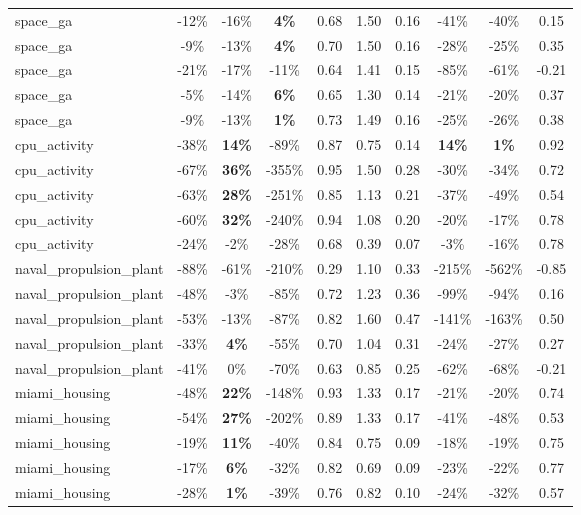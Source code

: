 \begin{table}[!htbp]
\begin{small}
\begin{sc}
{\begin{tabular}{lccccccccc}
space\_ga & -12\% & -16\% & \textbf{4\%} & 0.68 & 1.50 & 0.16 & -41\% & -40\% & 0.15 \\
space\_ga & -9\% & -13\% & \textbf{4\%} & 0.70 & 1.50 & 0.16 & -28\% & -25\% & 0.35 \\
space\_ga & -21\% & -17\% & -11\% & 0.64 & 1.41 & 0.15 & -85\% & -61\% & -0.21 \\
space\_ga & -5\% & -14\% & \textbf{6\%} & 0.65 & 1.30 & 0.14 & -21\% & -20\% & 0.37 \\
space\_ga & -9\% & -13\% & \textbf{1\%} & 0.73 & 1.49 & 0.16 & -25\% & -26\% & 0.38 \\
cpu\_activity & -38\% & \textbf{14\%} & -89\% & 0.87 & 0.75 & 0.14 & \textbf{14\%} & \textbf{1\%} & 0.92 \\
cpu\_activity & -67\% & \textbf{36\%} & -355\% & 0.95 & 1.50 & 0.28 & -30\% & -34\% & 0.72 \\
cpu\_activity & -63\% & \textbf{28\%} & -251\% & 0.85 & 1.13 & 0.21 & -37\% & -49\% & 0.54 \\
cpu\_activity & -60\% & \textbf{32\%} & -240\% & 0.94 & 1.08 & 0.20 & -20\% & -17\% & 0.78 \\
cpu\_activity & -24\% & -2\% & -28\% & 0.68 & 0.39 & 0.07 & -3\% & -16\% & 0.78 \\
naval\_propulsion\_plant & -88\% & -61\% & -210\% & 0.29 & 1.10 & 0.33 & -215\% & -562\% & -0.85 \\
naval\_propulsion\_plant & -48\% & -3\% & -85\% & 0.72 & 1.23 & 0.36 & -99\% & -94\% & 0.16 \\
naval\_propulsion\_plant & -53\% & -13\% & -87\% & 0.82 & 1.60 & 0.47 & -141\% & -163\% & 0.50 \\
naval\_propulsion\_plant & -33\% & \textbf{4\%} & -55\% & 0.70 & 1.04 & 0.31 & -24\% & -27\% & 0.27 \\
naval\_propulsion\_plant & -41\% & 0\% & -70\% & 0.63 & 0.85 & 0.25 & -62\% & -68\% & -0.21 \\
miami\_housing & -48\% & \textbf{22\%} & -148\% & 0.93 & 1.33 & 0.17 & -21\% & -20\% & 0.74 \\
miami\_housing & -54\% & \textbf{27\%} & -202\% & 0.89 & 1.33 & 0.17 & -41\% & -48\% & 0.53 \\
miami\_housing & -19\% & \textbf{11\%} & -40\% & 0.84 & 0.75 & 0.09 & -18\% & -19\% & 0.75 \\
miami\_housing & -17\% & \textbf{6\%} & -32\% & 0.82 & 0.69 & 0.09 & -23\% & -22\% & 0.77 \\
miami\_housing & -28\% & \textbf{1\%} & -39\% & 0.76 & 0.82 & 0.10 & -24\% & -32\% & 0.57 \\

\end{tabular}}
\end{sc}
\end{small}
\end{table}
